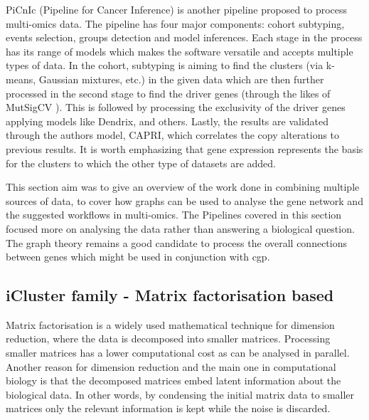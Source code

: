 
PiCnIc (Pipeline for Cancer Inference)\cite{Caravagna2016-vw} is another pipeline proposed to process multi-omics data. The pipeline has four major components: cohort subtyping, events selection, groups detection and model inferences\cite{Caravagna2016-vw}. Each stage in the process has its range of models which makes the software versatile and accepts multiple types of data. In the cohort, subtyping is aiming to find the clusters (via k-means, Gaussian mixtures, etc.) in the given data which are then further processed in the second stage to find the driver genes (through the likes of MutSigCV \cite{Lawrence2013-pl}). This is followed by processing the exclusivity of the driver genes applying models like Dendrix\cite{Vandin2012-cf}, \cite{Zhao2012-wj} and others. Lastly, the results are validated through the authors model, CAPRI, which correlates the copy alterations to previous results. It is worth emphasizing that gene expression represents the basis for the clusters to which the other type of datasets are added.


This section aim was to give an overview of the work done in combining multiple sources of data, to cover how graphs can be used to analyse the gene network and the suggested workflows in multi-omics. The Pipelines covered in this section focused more on analysing the data rather than answering a biological question. The graph theory remains a good candidate to process the overall connections between genes which might be used in conjunction with \acrlong{cgp}.


\subsection{iCluster family - Matrix factorisation based} 

Matrix factorisation is a widely used mathematical technique for dimension reduction, where the data is decomposed into smaller matrices. Processing smaller matrices has a lower computational cost as can be analysed in parallel. Another reason for dimension reduction and the main one in computational biology is that the decomposed matrices embed latent information about the biological data. In other words, by condensing the initial matrix data to smaller matrices only the relevant information is kept while the noise is discarded. 

